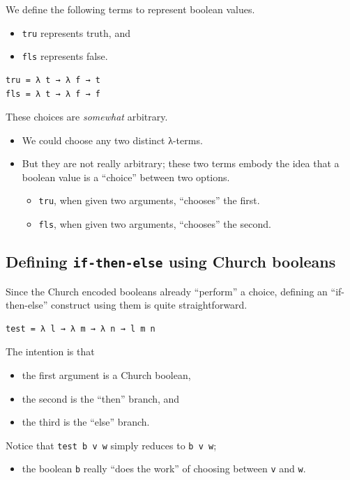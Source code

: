 \documentclass[11pt]{article}
\theoremstyle{definition}
\begin{document}
We define the following terms to represent boolean values.
\begin{itemize}
\item \texttt{tru} represents truth, and
\item \texttt{fls} represents false.
\end{itemize}
\begin{verbatim}
tru = λ t → λ f → t
fls = λ t → λ f → f
\end{verbatim}

These choices are \emph{somewhat} arbitrary.
\begin{itemize}
\item We could choose any two distinct λ-terms.
\item But they are not really arbitrary;
these two terms embody the idea that a boolean value
is a “choice” between two options.
\begin{itemize}
\item \texttt{tru}, when given two arguments, “chooses” the first.
\item \texttt{fls}, when given two arguments, “chooses” the second.
\end{itemize}
\end{itemize}

\subsection{Defining \texttt{if-then-else} using Church booleans}
\label{sec:org372517d}

Since the Church encoded booleans already “perform” a choice,
defining an “if-then-else” construct
using them is quite straightforward.
\begin{verbatim}
test = λ l → λ m → λ n → l m n
\end{verbatim}
The intention is that
\begin{itemize}
\item the first argument is a Church boolean,
\item the second is the “then” branch, and
\item the third is the “else” branch.
\end{itemize}

Notice that \texttt{test b v w} simply reduces to \texttt{b v w};
\begin{itemize}
\item the boolean \texttt{b} really “does the work”
of choosing between \texttt{v} and \texttt{w}.
\end{itemize}
\end{document}
